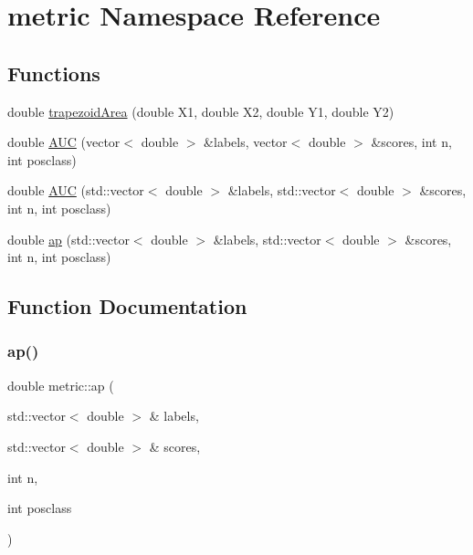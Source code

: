 \hypertarget{namespacemetric}{}\section{metric Namespace Reference}
\label{namespacemetric}
\subsection*{Functions}
\begin{DoxyCompactItemize}
\item 
double \hyperlink{namespacemetric_a87e5308fcebc95b5720c24dc70d74349}{trapezoid\+Area} (double X1, double X2, double Y1, double Y2)
\item 
double \hyperlink{namespacemetric_a57492bb556d712873ca231e6427a139e}{A\+UC} (vector$<$ double $>$ \&labels, vector$<$ double $>$ \&scores, int n, int posclass)
\item 
double \hyperlink{namespacemetric_af2bf0a8c7be4bee4eff0abaa603e842e}{A\+UC} (std\+::vector$<$ double $>$ \&labels, std\+::vector$<$ double $>$ \&scores, int n, int posclass)
\item 
double \hyperlink{namespacemetric_a3db123a20e7cf257d2c3777be1573094}{ap} (std\+::vector$<$ double $>$ \&labels, std\+::vector$<$ double $>$ \&scores, int n, int posclass)
\end{DoxyCompactItemize}


\subsection{Function Documentation}
\mbox{\label{namespacemetric_a3db123a20e7cf257d2c3777be1573094}} 
\subsubsection{\texorpdfstring{ap()}{ap()}}
{\footnotesize\ttfamily double metric\+::ap (\begin{DoxyParamCaption}\item[{std\+::vector$<$ double $>$ \&}]{labels,  }\item[{std\+::vector$<$ double $>$ \&}]{scores,  }\item[{int}]{n,  }\item[{int}]{posclass }\end{DoxyParamCaption})}

\mbox{\label{namespacemetric_a57492bb556d712873ca231e6427a139e}} 
